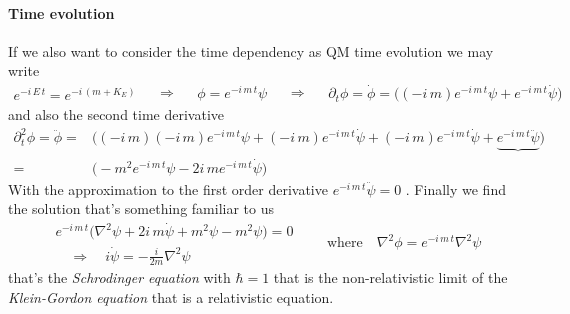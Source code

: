 \documentclass[class=article]{standalone}
\begin{document}
\paragraph{Time evolution} If we also want to consider the time dependency as QM time evolution we may write 
\begin{equation*}
\begin{split}
e^{- i \,E \, t} = e^{- i \, (m + K_E)} 
\end{split}\quad\Rightarrow\quad
\begin{split}
\phi = e^{- i \, m \, t} \psi
\end{split}\quad\Rightarrow\quad
\begin{split}
\partial_t \phi = \dot \phi = \Big(   (-i\,m) e^{- i \, m \, t} \psi + e^{- i \, m \, t} \dot \psi   \Big) 
\end{split}
\end{equation*}
and also the second time derivative
\begin{equation*}
\begin{split}
\partial^2_t \phi =  \ddot \phi = &  \Big(   (-i\,m)  (-i\,m) e^{- i \, m \, t} \psi +  (-i\,m) e^{- i \, m \, t} \dot \psi +  (-i\,m) e^{- i \, m \, t} \dot \psi 
+ \underbrace{e^{- i \, m \, t} \ddot \psi }  \Big) \\
= & \Big(  -m^2 e^{- i \, m \, t} \psi  - 2 i\,m e^{- i \, m \, t} \dot \psi   \Big) 
\end{split}
\end{equation*}
With the approximation to the first order derivative $ e^{- i \, m \, t} \ddot \psi = 0 $ .
Finally we find the solution that's something familiar to us
\begin{equation*}
\begin{split}
& e^{- i \, m \, t} \Big(  \nabla^2 \psi + 2 i\,m \dot \psi + m^2 \psi - m^2 \psi  \Big) = 0 \\
& \quad\Rightarrow\quad i \dot \psi  = - \frac{i}{2m} \nabla^2 \psi
\end{split}
\quad\quad \mbox{where} \quad \nabla^2 \phi = e^{- i \, m \, t} \nabla^2 \psi 
\end{equation*}
that's the \emph{Schrodinger equation} with $\hbar = 1$ that is the non-relativistic limit of the \emph{Klein-Gordon equation} that is a relativistic equation.



\newpage
\end{document}
